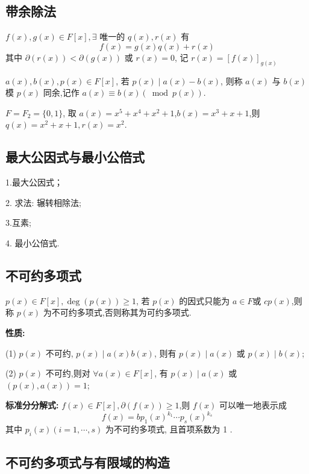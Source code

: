 \subsection{带余除法}
\begin{theorem}
    $ f(x), g(x) \in F[x], \exists $ 唯一的 $ q(x), r(x) $ 有
$$
f(x)=g(x) q(x)+r(x)
$$
其中 $ \partial(r(x))<\partial(g(x)) $ 或 $ r(x)=0 $, 记 $ r(x)=[f(x)]_{g(x)} $
\end{theorem}
\begin{definition}[同余]
    $ a(x), b(x), p(x) \in F[x] $, 若 $ p(x) \mid a(x)-b(x) $, 则称 $ a(x) $ 与 $ b(x) $ 模 $ p(x) $ 同余,记作 $ a(x) \equiv b(x)(\bmod p(x)) $.
\end{definition}
\begin{example}
    $ F=F_{2}=\{0,1\} $, 取 $ a(x)=x^{5}+x^{4}+x^{2}+1 $,$b(x)=x^{3}+x+1$,则 $ q(x)=x^{2}+x+1, r(x)=x^{2} $.
\end{example}

\subsection{最大公因式与最小公倍式}

1.最大公因式；

2. 求法: 辗转相除法;

3.互素;

4. 最小公倍式.
\subsection{不可约多项式}
\begin{definition}
    $ p(x) \in F[x], \operatorname{deg}(p(x)) \geqslant 1 $, 若 $ p(x) $ 的因式只能为 $ a \in F $或 $ c p(x) $,则称 $ p(x) $ 为不可约多项式,否则称其为可约多项式.
\end{definition}
\textbf{性质:}

(1) $ p(x) $ 不可约, $ p(x) \mid a(x) b(x) $, 则有 $ p(x) \mid a(x) $ 或 $ p(x) \mid b(x) $;

(2) $ p(x) $ 不可约,则对 $ \forall a(x) \in F[x] $, 有 $ p(x) \mid a(x) $ 或 $ (p(x), a(x))=1 $;

\textbf{标准分分解式:}
$ f(x) \in F[x], \partial(f(x)) \geqslant 1 $,则 $ f(x) $ 可以唯一地表示成
$$
f(x)=b p_{1}(x)^{k_{1}} \cdots p_{s}(x)^{k_{s}}
$$
其中 $ p_{i}(x)(i=1, \cdots, s) $ 为不可约多项式, 且首项系数为 1 .



\subsection{不可约多项式与有限域的构造}

